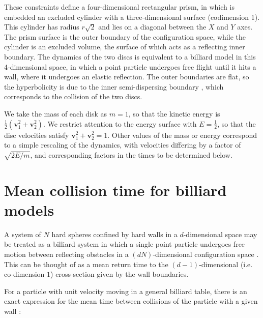 \documentclass[superscriptaddress,pre,reprint,showpacs,twocolumn]{revtex4-1}
\begin{document}
These constraints define a four-dimensional
rectangular prism, in which is embedded an excluded cylinder with a three-dimensional surface
(codimension 1).
This cylinder has radius $r\sqrt{2}$ and lies
on a diagonal between the $X$ and $Y$ axes.
The prism surface is the outer boundary of the configuration space,
while the cylinder is an excluded volume, the surface of which
acts as a reflecting inner boundary.
The dynamics of the two discs is equivalent to a billiard model in this 4-dimensional space, in which 
a point particle undergoes free flight until
it hits a wall, where it undergoes an elastic reflection.
The outer boundaries are flat, so the
hyperbolicity is due to the inner semi-dispersing
boundary \cite{Sim99}, which corresponds to the collision of
the two discs.


We take the mass of each disk as $m=1$, so that the kinetic energy
is $\frac{1}{2}(\mathbf{v}_1^2 + \mathbf{v}_2^2)$. We restrict attention to the energy surface with
$E = \frac{1}{2}$, so that the disc velocities satisfy $\mathbf{v}_1^2 + \mathbf{v}_2^2 = 1$.
Other values of the mass or energy correspond to a simple rescaling of the dynamics, with velocities differing
by a factor of
$\sqrt{2E/m}$, and corresponding factors in the times to be determined below.


\section{Mean collision time for billiard models}

\label{knownfacts}

A system of $N$ hard spheres confined by hard walls in a $d$-dimensional
space may be treated as a billiard system 
in which a single point  particle undergoes free motion between reflecting obstacles 
in a $ (d N) $-dimensional configuration space \cite{Sinai70, Sim99, MarkChern}. 
This can be thought of as a mean return time to the $(d-1)$-dimensional 
(i.e. co-dimension $1$) cross-section given by the wall boundaries.

For a particle with unit velocity moving in a general billiard table, there is 
an exact expression for the mean time between 
collisions of the particle with a given wall \cite{Chernov97}:
\end{document}
